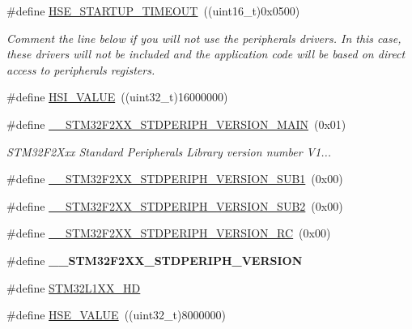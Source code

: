 \begin{DoxyCompactItemize}
\item 
\#define \hyperlink{group___library__configuration__section_ga68ecbc9b0a1a40a1ec9d18d5e9747c4f}{H\-S\-E\-\_\-\-S\-T\-A\-R\-T\-U\-P\-\_\-\-T\-I\-M\-E\-O\-U\-T}~((uint16\-\_\-t)0x0500)
\begin{DoxyCompactList}\small\item\em Comment the line below if you will not use the peripherals drivers. In this case, these drivers will not be included and the application code will be based on direct access to peripherals registers. \end{DoxyCompactList}\item 
\#define \hyperlink{group___library__configuration__section_gaaa8c76e274d0f6dd2cefb5d0b17fbc37}{H\-S\-I\-\_\-\-V\-A\-L\-U\-E}~((uint32\-\_\-t)16000000)
\item 
\#define \hyperlink{group___library__configuration__section_ga072660793dc1fbd608d6f5ed08ba99cc}{\-\_\-\-\_\-\-S\-T\-M32\-F2\-X\-X\-\_\-\-S\-T\-D\-P\-E\-R\-I\-P\-H\-\_\-\-V\-E\-R\-S\-I\-O\-N\-\_\-\-M\-A\-I\-N}~(0x01)
\begin{DoxyCompactList}\small\item\em S\-T\-M32\-F2\-Xxx Standard Peripherals Library version number V1... \end{DoxyCompactList}\item 
\#define \hyperlink{group___library__configuration__section_ga888af6ba4a16afadd1c64108a36b9a24}{\-\_\-\-\_\-\-S\-T\-M32\-F2\-X\-X\-\_\-\-S\-T\-D\-P\-E\-R\-I\-P\-H\-\_\-\-V\-E\-R\-S\-I\-O\-N\-\_\-\-S\-U\-B1}~(0x00)
\item 
\#define \hyperlink{group___library__configuration__section_gaefad6115d1d1c9b6444fe5130fa70aa3}{\-\_\-\-\_\-\-S\-T\-M32\-F2\-X\-X\-\_\-\-S\-T\-D\-P\-E\-R\-I\-P\-H\-\_\-\-V\-E\-R\-S\-I\-O\-N\-\_\-\-S\-U\-B2}~(0x00)
\item 
\#define \hyperlink{group___library__configuration__section_ga76710ff54eeec299653334d25b548073}{\-\_\-\-\_\-\-S\-T\-M32\-F2\-X\-X\-\_\-\-S\-T\-D\-P\-E\-R\-I\-P\-H\-\_\-\-V\-E\-R\-S\-I\-O\-N\-\_\-\-R\-C}~(0x00)
\item 
\#define {\bfseries \-\_\-\-\_\-\-S\-T\-M32\-F2\-X\-X\-\_\-\-S\-T\-D\-P\-E\-R\-I\-P\-H\-\_\-\-V\-E\-R\-S\-I\-O\-N}
\item 
\#define \hyperlink{group___library__configuration__section_ga9c5d143a41febbee11e6700b66822776}{S\-T\-M32\-L1\-X\-X\-\_\-\-H\-D}
\item 
\#define \hyperlink{group___library__configuration__section_gaeafcff4f57440c60e64812dddd13e7cb}{H\-S\-E\-\_\-\-V\-A\-L\-U\-E}~((uint32\-\_\-t)8000000)

\end{DoxyCompactItemize}
